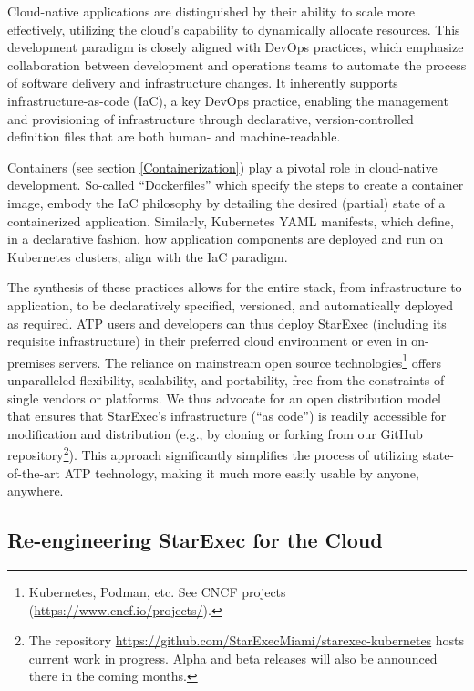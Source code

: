 \documentclass{easychair}
\begin{document}
Cloud-native applications are distinguished by their ability to scale more effectively, utilizing the cloud's capability to dynamically allocate resources. This development paradigm is closely aligned with DevOps practices, which emphasize collaboration between development and operations teams to automate the process of software delivery and infrastructure changes. It inherently supports infrastructure-as-code (IaC), a key DevOps practice, enabling the management and provisioning of infrastructure through declarative, version-controlled definition files that are both human- and machine-readable.

Containers (see section \ref{Containerization}) play a pivotal role in cloud-native development. So-called ``Dockerfiles'' which specify the steps to create a container image, embody the IaC philosophy by detailing the desired (partial) state of a containerized application. Similarly, Kubernetes YAML manifests, which define, in a declarative fashion, how application components are deployed and run on Kubernetes clusters, align with the IaC paradigm.

The synthesis of these practices allows for the entire stack, from infrastructure to application, to be declaratively specified,  versioned, and automatically deployed as required. ATP users and developers can thus deploy StarExec (including its requisite infrastructure) in their preferred cloud environment or even in on-premises servers. The reliance on mainstream open source technologies\footnote{Kubernetes, Podman, etc. See CNCF projects (\url{https://www.cncf.io/projects/}).} offers unparalleled flexibility, scalability, and portability, free from the constraints of single vendors or platforms.
We thus advocate for an open distribution model that ensures that StarExec's infrastructure (``as code'') is readily accessible for modification and distribution (e.g., by cloning or forking from our GitHub repository\footnote{The repository \url{https://github.com/StarExecMiami/starexec-kubernetes} hosts current work in progress. Alpha and beta releases will also be announced there in the coming months.}). This approach significantly simplifies the process of utilizing state-of-the-art ATP technology, making it much more easily usable by anyone, anywhere.

\subsection{Re-engineering StarExec for the Cloud}
\label{FutureStarExec}
\end{document}

